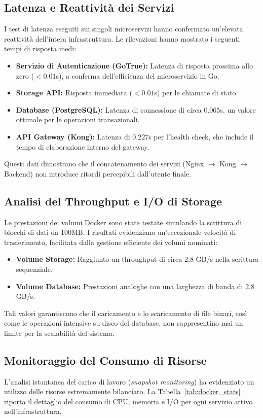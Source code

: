 \documentclass[12pt,a4paper]{report}
\begin{document}
\subsection{Latenza e Reattività dei Servizi}
I test di latenza eseguiti sui singoli microservizi hanno confermato
un'elevata reattività dell'intera infrastruttura. Le rilevazioni hanno
mostrato i seguenti tempi di risposta medi:
\begin{itemize}
  \item \textbf{Servizio di Autenticazione (GoTrue):} Latenza di risposta
    prossima allo zero ($<0.01$s), a conferma dell'efficienza del microservizio
    in Go.
  \item \textbf{Storage API:} Risposta immediata ($<0.01$s) per le chiamate di
    stato.
  \item \textbf{Database (PostgreSQL):} Latenza di connessione di circa
    $0.065$s, un valore ottimale per le operazioni transazionali.
  \item \textbf{API Gateway (Kong):} Latenza di $0.227$s per l'health check,
    che include il tempo di elaborazione interno del gateway.
\end{itemize}
Questi dati dimostrano che il concatenamento dei servizi (Nginx $\rightarrow$
Kong $\rightarrow$ Backend) non introduce ritardi percepibili dall'utente
finale.

\subsection{Analisi del Throughput e I/O di Storage}
Le prestazioni dei volumi Docker sono state testate simulando la scrittura di
blocchi di dati da $100$MB. I risultati evidenziano un'eccezionale velocità di
trasferimento, facilitata dalla gestione efficiente dei volumi nominati:
\begin{itemize}
  \item \textbf{Volume Storage:} Raggiunto un throughput di circa $2.8$ GB/s
    nella scrittura sequenziale.
  \item \textbf{Volume Database:} Prestazioni analoghe con una larghezza di
    banda di $2.8$ GB/s.
\end{itemize}
Tali valori garantiscono che il caricamento e lo scaricamento di file binari,
così come le operazioni intensive su disco del database, non rappresentino mai
un limite per la scalabilità del sistema.

\subsection{Monitoraggio del Consumo di Risorse}
L'analisi istantanea del carico di lavoro (\textit{snapshot monitoring}) ha
evidenziato un utilizzo delle risorse estremamente bilanciato. La
Tabella~\ref{tab:docker_stats} riporta il dettaglio del consumo di CPU, memoria
e I/O per ogni servizio attivo nell'infrastruttura.
\end{document}
